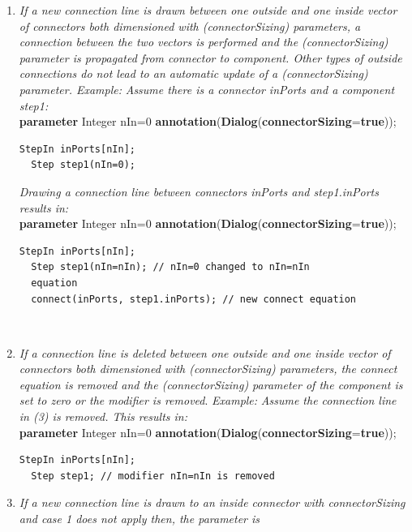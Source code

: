 \documentclass[10pt,a4paper]{report}
\renewcommand{\labelenumi}{\arabic{enumi}.}
\begin{document}
\begin{enumerate}
\def\labelenumi{\arabic{enumi}.}
\item
  \emph{If a new connection line is drawn between one outside and one
  inside vector of connectors both dimensioned with (connectorSizing)
  parameters, a connection between the two vectors is performed and the
  (connectorSizing) parameter is propagated from connector to component.
  Other types of outside connections do not lead to an automatic update
  of a (connectorSizing) parameter. Example:} \emph{Assume there is a
  connector inPorts and a component step1:\\
  } \textbf{parameter} Integer nIn=0
  \textbf{annotation}(\textbf{Dialog}(\textbf{connectorSizing}=\textbf{true}));\\
\begin{lstlisting}[language=modelica]
  StepIn inPorts[nIn];
  Step step1(nIn=0);
\end{lstlisting}
  \emph{Drawing a connection line between connectors inPorts and
  step1.inPorts results in:}\\
  \textbf{parameter} Integer nIn=0
  \textbf{annotation}(\textbf{Dialog}(\textbf{connectorSizing}=\textbf{true}));\\
\begin{lstlisting}[language=modelica]
  StepIn inPorts[nIn];
  Step step1(nIn=nIn); // nIn=0 changed to nIn=nIn
  equation
  connect(inPorts, step1.inPorts); // new connect equation
\end{lstlisting}
  \emph{\\
  }
\item
  \emph{If a connection line is deleted between one outside and one
  inside vector of connectors both dimensioned with (connectorSizing)
  parameters, the connect equation is removed and the (connectorSizing)
  parameter of the component is set to zero or the modifier is removed}.
  \emph{Example:} \emph{Assume the connection line in (3) is removed.
  This results in:}\\
  \textbf{parameter} Integer nIn=0
  \textbf{annotation}(\textbf{Dialog}(\textbf{connectorSizing}=\textbf{true}));\\
\begin{lstlisting}[language=modelica]
  StepIn inPorts[nIn];
  Step step1; // modifier nIn=nIn is removed
\end{lstlisting}
\item
  \emph{If a new connection line is drawn to an inside connector with
  connectorSizing and case 1 does not apply then, the parameter is
}
\end{enumerate}
\end{document}
